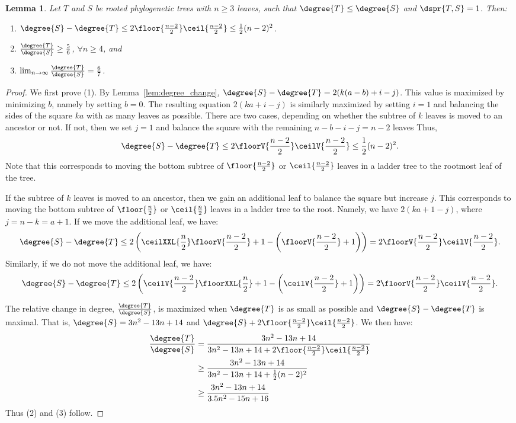 \documentclass{amsart}
\newtheorem{lemma}[theorem]{Lemma}
\begin{document}
\begin{lemma}
	\label{lem:degree_max_delta_adjacent}
	Let $T$ and $S$ be rooted phylogenetic trees with $n \ge 3$ leaves, such that $\degree{T} \le \degree{S}$ and $\dspr{T,S} = 1$.
	Then:
	\begin{enumerate}
		\item $\degree{S} - \degree{T} \le 2\floor{\frac{n-2}{2}}\ceil{\frac{n-2}{2}} \le \frac{1}{2} (n-2)^2 $.
		\item $\frac{\degree{T}}{\degree{S}} \ge \frac{5}{6}$, $\forall n \ge 4$, and
		\item $\lim_{n\rightarrow\infty}\frac{\degree{T}}{\degree{S}} =  \frac{6}{7}$.
	\end{enumerate}
\end{lemma}
\begin{proof}
	We first prove (1).
	By Lemma~\ref{lem:degree_change}, $\degree{S} - \degree{T} = 2(k(a-b) + i - j)$.
	This value is maximized by minimizing $b$, namely by setting $b=0$.
	The resulting equation $2(ka + i - j)$ is similarly maximized by setting $i=1$ and balancing the sides of the square $ka$ with as many leaves as possible.
	There are two cases, depending on whether the subtree of $k$ leaves is moved to an ancestor or not. If not, then we set $j=1$ and balance the square with the remaining $n-b-i-j = n-2$ leaves
	Thus, $$\degree{S} - \degree{T} \le 2\floorV{\frac{n-2}{2}}\ceilV{\frac{n-2}{2}} \le \frac{1}{2} (n-2)^2.$$
	Note that this corresponds to moving the bottom subtree of $\floor{\frac{n-2}{2}}$ or $\ceil{\frac{n-2}{2}}$ leaves in a ladder tree to the rootmost leaf of the tree.

	If the subtree of $k$ leaves is moved to an ancestor, then we gain an additional leaf to balance the square but increase $j$.
	This corresponds to moving the bottom subtree of $\floor{\frac{n}{2}}$ or $\ceil{\frac{n}{2}}$ leaves in a ladder tree to the root.
	Namely, we have $2(ka + 1 - j)$, where $j = n - k = a + 1$.
	If we move the additional leaf, we have:
$$\degree{S} - \degree{T} \le 2\left(\ceilXXL{\frac{n}{2}}\floorV{\frac{n-2}{2}}  + 1 - \left(\floorV{\frac{n-2}{2}} + 1\right)\right) = 2\floorV{\frac{n-2}{2}}\ceilV{\frac{n-2}{2}}.$$
Similarly, if we do not move the additional leaf, we have:
$$\degree{S} - \degree{T} \le 2 \left(\ceilV{\frac{n-2}{2}}\floorXXL{\frac{n}{2}} +1 -  \left(\ceilV{\frac{n-2}{2}} + 1\right)\right) = 2\floorV{\frac{n-2}{2}}\ceilV{\frac{n-2}{2}}.$$

	The relative change in degree, $\frac{\degree{T}}{\degree{S}}$, is maximized when $\degree{T}$ is as small as possible and $\degree{S} - \degree{T}$ is maximal.
	That is, $\degree{S} = 3n^2 - 13n + 14$ and $\degree{S} + 2\floor{\frac{n-2}{2}} \ceil{\frac{n-2}{2}}$.
	We then have:
	\begin{align*}
		\frac{\degree{T}}{\degree{S}} &= \frac{3n^2 - 13n + 14}{3n^2 - 13n + 14 + 2\floor{\frac{n-2}{2}} \ceil{\frac{n-2}{2}}} \\
		&\ge \frac{3n^2 - 13n + 14}{3n^2 - 13n + 14 + \frac{1}{2}(n-2)^2} \\
		&\ge \frac{3n^2 - 13n + 14}{3.5n^2 - 15n + 16}
	\end{align*}
	Thus (2) and (3) follow.

\end{proof}
\end{document}
